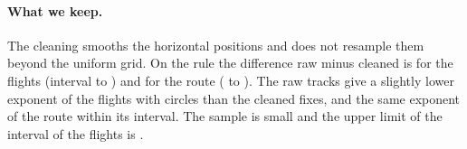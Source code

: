 \begin{table}[t]
\centering
\caption{$H$ of the same \flRawNBoth{} flights from the raw IGC files and from the cleaned fixes, and the
difference, with 95\% intervals from the same resamples of flights.}
\label{tab:flrawcheck}
\footnotesize
\setlength{\tabcolsep}{3pt}

\end{table}

\paragraph{What we keep.} The cleaning smooths the horizontal positions and does not resample them beyond the
uniform grid. On the rule the difference raw minus cleaned is \flRawDynRule{} for the flights (interval
\flRawDynRuleLo{} to \flRawDynRuleHi) and \flRawRouteRule{} for the route (\flRawRouteRuleLo{} to
\flRawRouteRuleHi). The raw tracks give a slightly lower exponent of the flights with circles than the cleaned fixes, and the same
exponent of the route within its interval. The sample is small and the upper limit of the interval of the
flights is \flRawDynRuleHi.

